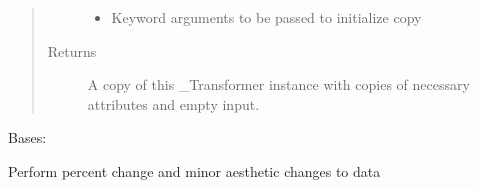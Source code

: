 \documentclass[letterpaper,10pt,english]{sphinxmanual}
\begin{document}
\begin{fulllineitems}
\begin{fulllineitems}
\begin{quote}
\begin{description}
\begin{itemize}
\item {} 
 \textendash{} Keyword arguments to be passed to initialize copy

\end{itemize}

\item[{Returns}] \leavevmode
A copy of this \_Transformer instance with copies of necessary
attributes and empty input.

\end{description}\end{quote}

\end{fulllineitems}


\end{fulllineitems}


\begin{fulllineitems}
\label{\detokenize{dalio.pipe:dalio.pipe.StockReturns}}
Bases: {\hyperref[\detokenize{beginners-guide:dalio.pipe.col_generation._ColGeneration}]{}}

Perform percent change and minor aesthetic changes to data

\end{fulllineitems}

\end{document}
